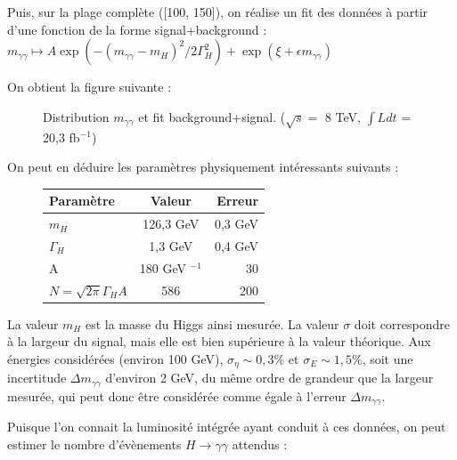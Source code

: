 \documentclass[11pt]{article} %
\begin{document}
Puis, sur la plage complète ([100, 150]), on réalise un fit des données à partir d'une fonction de la forme signal+background : $m_{\gamma\gamma} \mapsto  A \exp\left(-(m_{\gamma\gamma}-m_H)^2/2\Gamma_H^2\right) + \exp(\xi + \epsilon m_{\gamma\gamma})$

On obtient la figure suivante :

\begin{figure}[H]
\centering
  \caption{\label{fig:higgs_mgg}Distribution $m_{\gamma \gamma}$ et fit background+signal. ($\sqrt{s} =$ 8 TeV,  $\int L dt$ = 20,3 fb$^{-1}$) }
 \resizebox{.8\linewidth}{!}{}
\end{figure}

On peut en déduire les paramètres physiquement intéressants suivants :

\begin{figure}[H]
\centering
\begin{tabular}{|l|c|r|} 
   \hline
   Paramètre & Valeur & Erreur \\
    \hline
   $m_H$ & 126,3 GeV & 0,3 GeV\\
  \hline
   $\Gamma_H$ & 1,3 GeV & 0,4 GeV \\
  \hline
A & 180 GeV ${}^{-1}$ & 30\\

 \hline
$N = \sqrt{2\pi} \Gamma_H A$ & 586 & 200\\
\hline
\end{tabular}
\end{figure}

La valeur $m_H$ est la masse du Higgs ainsi mesurée. La valeur $\sigma$ doit correspondre à la largeur du signal, mais elle est bien supérieure à la valeur théorique. Aux énergies considérées (environ 100 GeV), $\sigma_{\eta} \sim 0,3 \%$ \cite{resolution_position_photons} et $\sigma_{E} \sim 1,5 \%$, soit une incertitude $\Delta m_{\gamma\gamma}$ d'environ 2 GeV, du même ordre de grandeur que la largeur mesurée, qui peut donc être considérée comme égale à l'erreur $\Delta m_{\gamma\gamma}$.


Puisque l'on connait la luminosité intégrée ayant conduit à ces données, on peut estimer le nombre d'évènements $H \to \gamma\gamma$ attendus :
\end{document}
